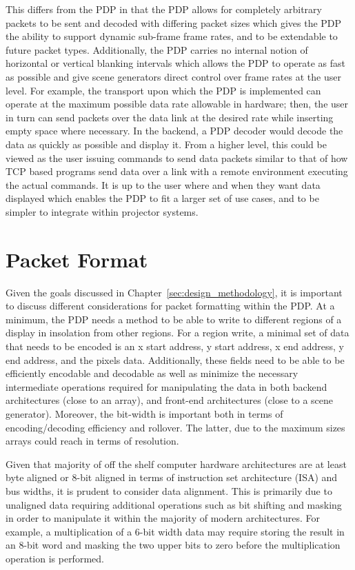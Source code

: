     This differs from the PDP in that the PDP allows for completely arbitrary packets to be sent and decoded with differing packet sizes which gives the PDP the ability to support dynamic sub-frame frame rates, and to be extendable to future packet types. Additionally, the PDP carries no internal notion of horizontal or vertical blanking intervals which allows the PDP to operate as fast as possible and give scene generators direct control over frame rates at the user level. For example, the transport upon which the PDP is implemented can operate at the maximum possible data rate allowable in hardware; then, the user in turn can send packets over the data link at the desired rate while inserting empty space where necessary. In the backend, a PDP decoder would decode the data as quickly as possible and display it. From a higher level, this could be viewed as the user issuing commands to send data packets similar to that of how TCP based programs send data over a link with a remote environment executing the actual commands. It is up to the user where and when they want data displayed which enables the PDP to fit a larger set of use cases, and to be simpler to integrate within projector systems.

\section{Packet Format}
    \label{sec:packet_format}
    Given the goals discussed in Chapter~\ref{sec:design_methodology}, it is important to discuss different considerations for packet formatting within the PDP. At a minimum, the PDP needs a method to be able to write to different regions of a display in insolation from other regions. For a region write, a minimal set of data that needs to be encoded is an x start address, y start address, x end address, y end address, and the pixels data. Additionally, these fields need to be able to be efficiently encodable and decodable as well as minimize the necessary intermediate operations required for manipulating the data in both backend architectures (close to an array), and front-end architectures (close to a scene generator). Moreover, the bit-width is important both in terms of encoding/decoding efficiency and rollover. The latter, due to the maximum sizes arrays could reach in terms of resolution.

    Given that majority of off the shelf computer hardware architectures are at least byte aligned or 8-bit aligned in terms of instruction set architecture (ISA) and bus widths, it is prudent to consider data alignment. This is primarily due to unaligned data requiring additional operations such as bit shifting and masking in order to manipulate it within the majority of modern architectures. For example, a multiplication of a 6-bit width data may require storing the result in an 8-bit word and masking the two upper bits to zero before the multiplication operation is performed.

